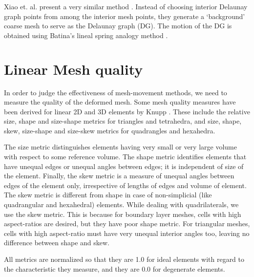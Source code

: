  
 Xiao et. al. present a very similar method \cite{mm:hybriddg}. Instead of choosing interior Delaunay graph points from among the interior mesh points, they generate a `background' coarse mesh to serve as the Delaunay graph (DG). The motion of the DG is obtained using Batina's lineal spring analogy method \cite{mm:batina}.
 
 \section{Linear Mesh quality}
 \label{sec:lin-mesh-quality}
 In order to judge the effectiveness of mesh-movement methods, we need to measure the quality of the deformed mesh. Some mesh quality measures have been derived for linear 2D and 3D elements by Knupp \cite{qualknupp}. These include the relative size, shape and size-shape metrics for triangles and tetrahedra, and size, shape, skew, size-shape and size-skew metrics for quadrangles and hexahedra.
 
 The size metric distinguishes elements having very small or very large volume with respect to some reference volume. The shape metric identifies elements that have unequal edges or unequal angles between edges; it is independent of size of the element. Finally, the skew metric is a measure of unequal angles between edges of the element only, irrespective of lengths of edges and volume of element. The skew metric is different from shape in case of non-simplicial (like quadrangular and hexahedral) elements. While dealing with quadrilaterals, we use the skew metric. This is because for boundary layer meshes, cells with high aspect-ratios are desired, but they have poor shape metric. For triangular meshes, cells with high aspect-ratio must have very unequal interior angles too, leaving no difference between shape and skew.
 
 All metrics are normalized so that they are 1.0 for ideal elements with regard to the characteristic they measure, and they are 0.0 for degenerate elements. 
 
